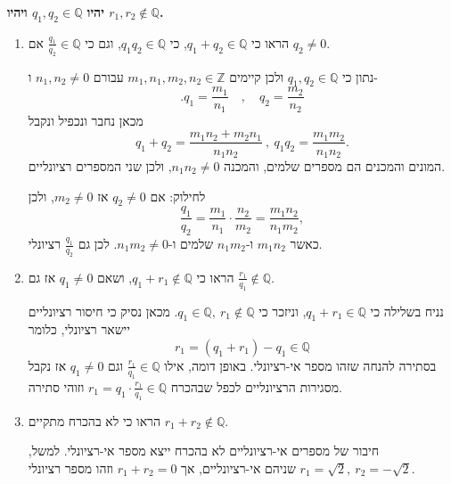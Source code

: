 \textbf{יהיו
$q_1,q_2\in\mathbb{Q}$
ויהיו
$r_1,r_2\notin\mathbb{Q}$.}
\begin{enumerate}
\item
הראו כי
$q_1+q_2\in\mathbb{Q}$,
כי
$q_1q_2\in\mathbb{Q}$,
וגם כי
$\frac{q_1}{q_2}\in\mathbb{Q}$
אם
$q_2\neq0$.
\begin{solbox}
נתון כי
$q_1,q_2\in\mathbb{Q}$
ולכן קיימים
$m_1,n_1,m_2,n_2\in\mathbb{Z}$
עבורם
$n_1,n_2\neq0$
ו-
$$.q_1=\frac{m_1}{n_1}\quad,\quad q_2=\frac{m_2}{n_2}$$
מכאן נחבר ונכפיל ונקבל
$$q_1+q_2=\frac{m_1n_2+m_2n_1}{n_1n_2}\ ,\ q_1q_2=\frac{m_1m_2}{n_1n_2}.$$
המונים והמכנים הם מספרים שלמים, והמכנה
$n_1n_2\neq0$,
ולכן שני המספרים רציונליים.

לחילוק: אם
$q_2\neq0$
אז
$m_2\neq0$,
ולכן
$$\frac{q_1}{q_2}=\frac{m_1}{n_1}\cdot\frac{n_2}{m_2}=\frac{m_1n_2}{n_1m_2},$$
כאשר
$m_1n_2$
ו-$n_1m_2$
שלמים ו-$n_1m_2\neq0$.
לכן גם
$\frac{q_1}{q_2}$
רציונלי.
\end{solbox}
\item
הראו כי
$q_1+r_1\notin\mathbb{Q}$,
ושאם
$q_1\neq0$
אז גם
$\frac{r_1}{q_1}\notin\mathbb{Q}$.
\begin{solbox}
נניח בשלילה כי
$q_1+r_1\in\mathbb{Q}$,
וניזכר כי
$q_1\in\mathbb{Q},\ r_1\notin\mathbb{Q}$.
מכאן נסיק כי חיסור רציונליים יישאר רציונלי, כלומר
$$r_1=(q_1+r_1)-q_1\in\mathbb{Q}$$
בסתירה להנחה שזהו מספר אי-רציונלי.
באופן דומה, אילו
$\frac{r_1}{q_1}\in\mathbb{Q}$
וגם
$q_1\neq0$
אז נקבל מסגירות הרציונליים לכפל שבהכרח
$r_1=q_1\cdot\frac{r_1}{q_1}\in\mathbb{Q}$
וזוהי סתירה.
\end{solbox}
\item
הראו כי לא בהכרח מתקיים
$r_1+r_2\notin\mathbb{Q}$.
\begin{solbox}
חיבור של מספרים אי-רציונליים לא בהכרח ייצא מספר אי-רציונלי. למשל,
$r_1=\sqrt2,\ r_2=-\sqrt2$
שניהם אי-רציונליים, אך
$r_1+r_2=0$
וזהו מספר רציונלי.
\end{solbox}
\end{enumerate}
